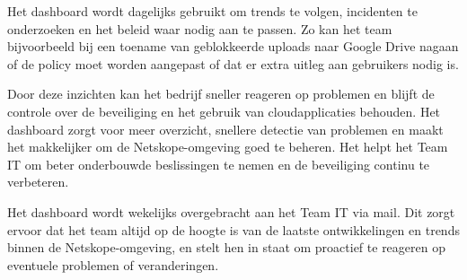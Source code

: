 Het dashboard wordt dagelijks gebruikt om trends te volgen, incidenten te onderzoeken en het beleid waar nodig aan te passen. Zo kan het team bijvoorbeeld bij een toename van geblokkeerde uploads naar Google Drive nagaan of de policy moet worden aangepast of dat er extra uitleg aan gebruikers nodig is.

\vspace{2ex}

Door deze inzichten kan het bedrijf sneller reageren op problemen en blijft de controle over de beveiliging en het gebruik van cloudapplicaties behouden. Het dashboard zorgt voor meer overzicht, snellere detectie van problemen en maakt het makkelijker om de Netskope-omgeving goed te beheren. Het helpt het Team IT om beter onderbouwde beslissingen te nemen en de beveiliging continu te verbeteren.

\vspace{2ex}

Het dashboard wordt wekelijks overgebracht aan het Team IT via mail. Dit zorgt ervoor dat het team altijd op de hoogte is van de laatste ontwikkelingen en trends binnen de Netskope-omgeving, en stelt hen in staat om proactief te reageren op eventuele problemen of veranderingen.